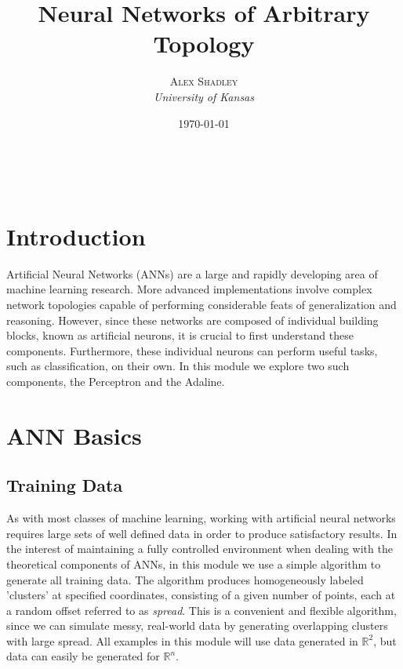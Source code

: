 \documentclass[a4paper, 11pt]{article} %
\title{\textbf{Neural Networks of Arbitrary Topology}} %
\author{\textsc{Alex Shadley} %
\\{\textit{University of Kansas}}} %
\date{\today} %
\makeatletter
\renewcommand{\maketitle}{ %
\begin{flushright} %
{\LARGE\@title} %

\vspace{50pt} %

{\large\@author} %
\\\@date %

\vspace{40pt} %
\end{flushright}
}
\makeatother
\begin{document}
\maketitle %


\section*{Introduction}

Artificial Neural Networks (ANNs) are a large and rapidly developing area of machine learning research.  More advanced implementations involve complex network topologies capable of performing considerable feats of generalization and reasoning.  However, since these networks are composed of individual building blocks, known as artificial neurons, it is crucial to first understand these components.  Furthermore, these individual neurons can perform useful tasks, such as classification, on their own.  In this module we explore two such components, the Perceptron and the Adaline.

\section*{ANN Basics}

\subsection*{Training Data}

As with most classes of machine learning, working with artificial neural networks requires large sets of well defined data in order to produce satisfactory results.  In the interest of maintaining a fully controlled environment when dealing with the theoretical components of ANNs, in this module we use a simple algorithm to generate all training data.  The algorithm produces homogeneously labeled 'clusters' at specified coordinates, consisting of a given number of points, each at a random offset referred to as \textit{spread}.  This is a convenient and flexible algorithm, since we can simulate messy, real-world data by generating overlapping clusters with large spread.  All examples in this module will use data generated in $\mathbb{R}^2$, but data can easily be generated for $\mathbb{R}^n$.
\end{document}
